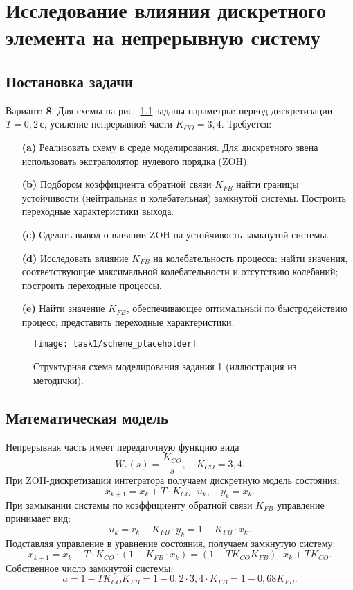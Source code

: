 
\chapter{Исследование влияния дискретного элемента на непрерывную систему}
\section{Постановка задачи}
Вариант: \textbf{8}. Для схемы на рис.~\ref{fig:task1_scheme} заданы параметры: период дискретизации \(T=0{,}2\,\text{с}\), усиление непрерывной части \(K_{CO}=3{,}4\). Требуется:
\begin{enumerate}
  \item[\textbf{(a)}] Реализовать схему в среде моделирования. Для дискретного звена использовать экстраполятор нулевого порядка (ZOH).
  \item[\textbf{(b)}] Подбором коэффициента обратной связи \(K_{FB}\) найти границы устойчивости (нейтральная и колебательная) замкнутой системы. Построить переходные характеристики выхода.
  \item[\textbf{(c)}] Сделать вывод о влиянии ZOH на устойчивость замкнутой системы.
  \item[\textbf{(d)}] Исследовать влияние \(K_{FB}\) на колебательность процесса: найти значения, соответствующие максимальной колебательности и отсутствию колебаний; построить переходные процессы.
  \item[\textbf{(e)}] Найти значение \(K_{FB}\), обеспечивающее оптимальный по быстродействию процесс; представить переходные характеристики.
\end{enumerate}

\begin{figure}[H]
  \centering
  \texttt{[image: task1/scheme\_placeholder]}
  \caption{Структурная схема моделирования задания 1 (иллюстрация из методички).}
  \label{fig:task1_scheme}
\end{figure}

\section{Математическая модель}
Непрерывная часть имеет передаточную функцию вида
\[
  W_c(s) = \frac{K_{CO}}{s}, \quad K_{CO}=3{,}4.
\]
При ZOH-дискретизации интегратора получаем дискретную модель состояния:
\[
  x_{k+1} = x_k + T \cdot K_{CO} \cdot u_k, \quad y_k = x_k.
\]
При замыкании системы по коэффициенту обратной связи \(K_{FB}\) управление принимает вид:
\[
  u_k = r_k - K_{FB} \cdot y_k = 1 - K_{FB} \cdot x_k.
\]
Подставляя управление в уравнение состояния, получаем замкнутую систему:
\[
  x_{k+1} = x_k + T \cdot K_{CO} \cdot (1 - K_{FB} \cdot x_k) = (1 - T K_{CO} K_{FB}) \cdot x_k + T K_{CO}.
\]
Собственное число замкнутой системы:
\[
  a = 1 - T K_{CO} K_{FB} = 1 - 0{,}2 \cdot 3{,}4 \cdot K_{FB} = 1 - 0{,}68 K_{FB}.
\]


